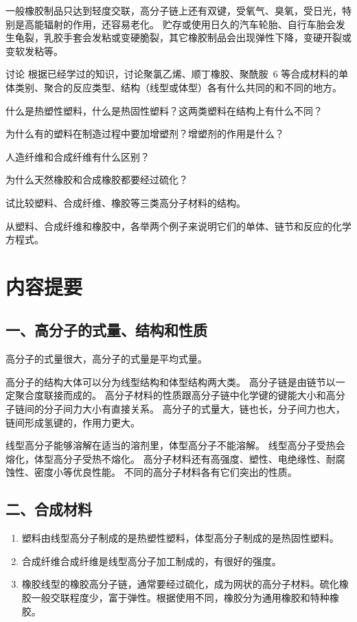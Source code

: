 一般橡胶制品只达到轻度交联，高分子链上还有双键，受氧气、臭氧，受日光，特别是高能辐射的作用，还容易老化。
贮存或使用日久的汽车轮胎、自行车胎会发生龟裂，乳胶手套会发粘或变硬脆裂，其它橡胶制品会出现弹性下降，变硬开裂或变软发粘等。

\begin{Theorem}{讨论}
  根据已经学过的知识，讨论聚氯乙烯、顺丁橡胶、聚酰胺~6 等合成材料的单体类别、聚合的反应类型、结构（线型或体型）各有什么共同的和不同的地方。
\end{Theorem}


\begin{Practice}
  \begin{question}
    \item 什么是热塑性塑料，什么是热固性塑料？这两类塑料在结构上有什么不同？
    \item 为什么有的塑料在制造过程中要加增塑剂？增塑剂的作用是什么？
    \item 人造纤维和合成纤维有什么区别？
    \item 为什么天然橡胶和合成橡胶都要经过硫化？
    \item 试比较塑料、合成纤维、橡胶等三类高分子材料的结构。
    \item 从塑料、合成纤维和橡胶中，各举两个例子来说明它们的单体、链节和反应的化学方程式。
  \end{question}
\end{Practice}

\section*{内容提要}
\setcounter{subsection}{0}
\subsection*{一、高分子的式量、结构和性质}
高分子的式量很大，高分子的式量是平均式量。

高分子的结构大体可以分为线型结构和体型结构两大类。
高分子链是由链节以一定聚合度联接而成的。
高分子材料的性质跟高分子链中化学键的键能大小和高分子链间的分子间力大小有直接关系。
高分子的式量大，链也长，分子间力也大，链间形成氢键的，作用力更大。

线型高分子能够溶解在适当的溶剂里，体型高分子不能溶解。
线型高分子受热会熔化，体型高分子受热不熔化。
高分子材料还有高强度、塑性、电绝缘性、耐腐蚀性、密度小等优良性能。
不同的高分子材料各有它们突出的性质。

\subsection*{二、合成材料}
\begin{enumerate}
  \item 塑料\quad 由线型高分子制成的是热塑性塑料，体型高分子制成的是热固性塑料。
  \item 合成纤维\quad 合成纤维是线型高分子加工制成的，有很好的强度。
  \item 橡胶\quad 线型的橡胶高分子链，通常要经过硫化，成为网状的高分子材料。硫化橡胶一般交联程度少，富于弹性。根据使用不同，橡胶分为通用橡胶和特种橡胶。
\end{enumerate}

